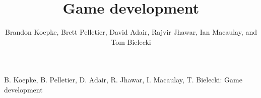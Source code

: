 \title{Game development}

\author{Brandon Koepke, Brett Pelletier, David Adair, Rajvir Jhawar, Ian Macaulay, and Tom Bielecki}

%
{B. Koepke, B. Pelletier, D. Adair, R. Jhawar, I. Macaulay, T. Bielecki: Game development}

\maketitle
